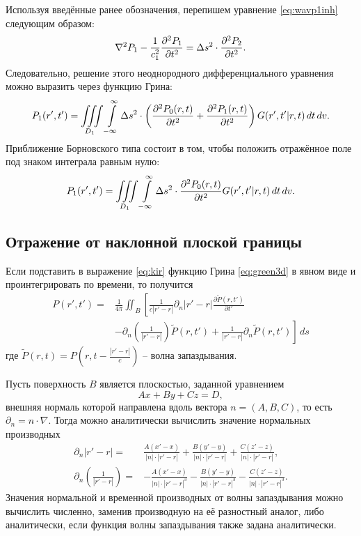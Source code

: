 \documentclass[a4paper, fontsize=14pt]{article}
\begin{document}
	Используя введённые ранее обозначения, перепишем уравнение \ref{eq:wavp1inh} следующим образом:
	\begin{equation}
		\nabla^2 P_1 - \frac{1}{c_1^2}\diff[2]{P_1}{t}  = \Delta s^2 \cdot \diff[2]{P_2}{t}.
	\end{equation}
	Следовательно, решение этого неоднородного дифференциального уравнения можно выразить через функцию Грина:
	\begin{equation}
		P_1(r',t')   = \iiint\limits_{D_1} \int\limits_{-\infty}^{\infty} \Delta s^2 \cdot \left(\diff[2]{P_0(r,t)}{t}+\diff[2]{P_1(r,t)}{t}\right) G(r',t'|r,t)\, dt \, dv.
	\end{equation}
	Приближение Борновского типа состоит в том, чтобы положить отражённое поле под знаком интеграла равным нулю:
	\begin{equation}
		P_1(r',t')   = \iiint\limits_{D_1} \int\limits_{-\infty}^{\infty} \Delta s^2 \cdot 	\diff[2]{P_0(r,t)}{t} G(r',t'|r,t)\, dt \, dv.
	\end{equation}
	
	\subsection{Отражение от наклонной плоской границы}
		Если подставить в выражение \ref{eq:kir} функцию Грина \ref{eq:green3d} в явном виде и проинтегрировать по времени, то получится \cite{magisters}
	\begin{align}
		P(r',t') =& \frac{1}{4\pi} \iint_B	\left[ \frac{1}{c|r'-r|}\partial_n|r'-r|\frac{\partial \tilde{P}(r,t')}{\partial t'} \right.\nonumber \\
		&\left. - \partial_n
		\left(\frac{1}{|r'-r|}\right)\tilde{P}(r,t') +\frac{1}{|r'-r|}\partial_n \tilde{P}(r,t')\right]\,ds
		\label{eq:kirgreen3d}
	\end{align}
	где $\tilde{P}(r,t) = P\left(r,t - \frac{|r'-r|}{c}\right)$ -- волна запаздывания.
	
		Пусть поверхность $B$ является плоскостью, заданной уравнением 
		$$
			Ax+By+Cz=D,
		$$ внешняя нормаль которой направлена вдоль вектора $n =(A,B,C)$, то есть $\partial_n = n \cdot \nabla$. Тогда можно аналитически вычислить значение нормальных производных
		\begin{eqnarray}
			\partial_n|r'-r| =&\frac{A(x' - x)}{|n|\cdot|r' - r|}+\frac{B(y' - y)}{|n|\cdot |r' - r|} + \frac{C(z' - z)}{|n|\cdot|r' - r|}, \\ 
			\partial_n\left(\frac{1}{|r'-r|}\right) =&  - \frac{A(x' - x)}{|n|\cdot|r' - r|^3}-\frac{B(y' - y)}{|n|\cdot |r' - r|^3} - \frac{C(z' - z)}{|n|\cdot|r' - r|^3}.
		\end{eqnarray} 
		Значения нормальной и временной производных от волны запаздывания можно вычислить численно, заменив производную на её разностный аналог, либо аналитически, если функция волны запаздывания также задана аналитически.
		
\end{document}
